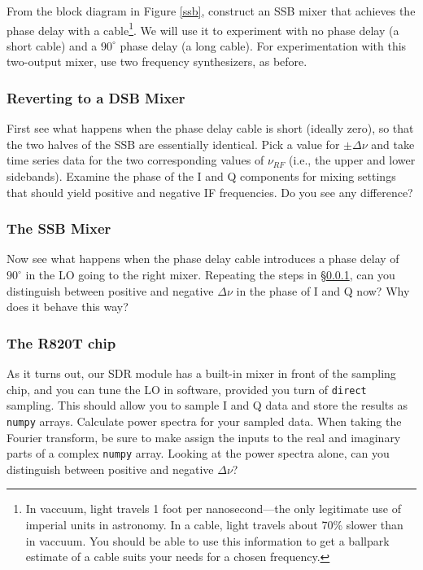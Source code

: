 \documentclass[11pt,preprint]{aastex}
\begin{document}
From the block diagram in Figure \ref{ssb}, construct an SSB mixer that
achieves the phase delay with a cable\footnote{In vaccuum, light travels
1 foot per nanosecond---the only legitimate use of
imperial units in astronomy. In a cable, light travels about
70\% slower than in vaccuum. You should be able to use this information
to get a ballpark estimate of a cable suits your
needs for a chosen frequency.}. We will use
it to experiment with no phase delay (a short cable) and a $90^\circ$
phase delay (a long cable).  For experimentation with this two-output
mixer, use two frequency synthesizers, as before.

\subsubsection{Reverting to a DSB Mixer} \label{dsbmixer}

\noindent
First see what happens when the phase delay cable is short (ideally
zero), so that the two halves of the SSB are essentially identical.
Pick a value for $\pm\Delta\nu$ and take time
series data for the two corresponding values of $\nu_{RF}$ (i.e., the
upper and lower sidebands). Examine the phase of the I and Q components
for mixing settings that should yield positive and negative IF
frequencies. Do you see any difference?

\subsubsection{The SSB Mixer}

\noindent
Now see what happens when the phase delay cable introduces a 
phase delay of $90^\circ$ in the LO going to the right mixer.
Repeating the steps in \S \ref{dsbmixer},
can you distinguish between positive and negative
$\Delta\nu$ in the phase of I and Q now?
Why does it behave this way?

\subsubsection{The R820T chip}

As it turns out, our SDR module has a built-in mixer in front
of the sampling chip, and you can tune the LO in software,
provided you turn of {\tt direct} sampling.
This should allow you to sample I and Q data and store the
results as {\tt numpy} arrays.
Calculate power spectra for your sampled data. When taking the
Fourier transform, be sure to make assign the inputs to the real and imaginary
parts of a complex {\tt numpy} array.
Looking at the power spectra alone, can you distinguish between positive and negative $\Delta
\nu$?
\end{document}
